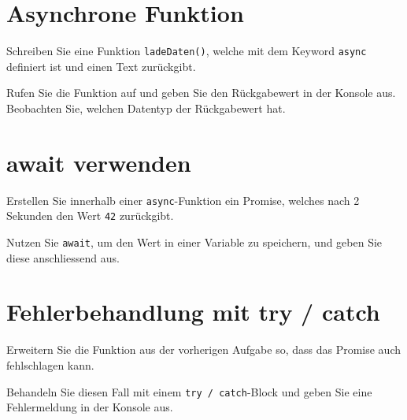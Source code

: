 \documentclass[a4paper,12pt]{article}
\begin{document}
\section{Asynchrone Funktion}

Schreiben Sie eine Funktion \texttt{ladeDaten()}, welche mit dem Keyword \texttt{async} definiert ist und einen Text zurückgibt.

Rufen Sie die Funktion auf und geben Sie den Rückgabewert in der Konsole aus.  
Beobachten Sie, welchen Datentyp der Rückgabewert hat.

\section{await verwenden}

Erstellen Sie innerhalb einer \texttt{async}-Funktion ein Promise, welches nach 2 Sekunden den Wert \texttt{42} zurückgibt.

Nutzen Sie \texttt{await}, um den Wert in einer Variable zu speichern, und geben Sie diese anschliessend aus.

\section{Fehlerbehandlung mit try / catch}

Erweitern Sie die Funktion aus der vorherigen Aufgabe so, dass das Promise auch fehlschlagen kann.

Behandeln Sie diesen Fall mit einem \texttt{try / catch}-Block und geben Sie eine Fehlermeldung in der Konsole aus.
\end{document}
